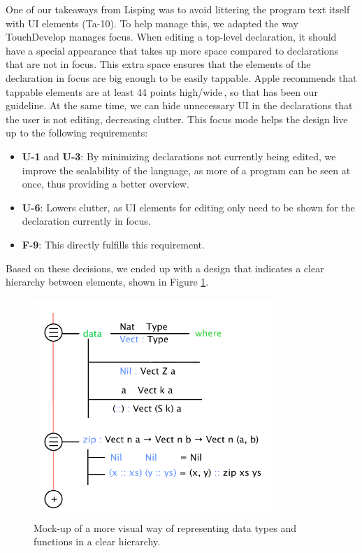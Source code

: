 
One of our takeaways from Lisping was to avoid littering the program text itself with UI elements
(Ta-10).
To help manage this, we adapted the way TouchDevelop manages focus.
When editing a top-level declaration, it should have a special appearance that takes up more space compared to declarations that are not in focus.
This extra space ensures that the elements of the declaration in focus are big enough to be easily tappable. 
Apple recommends that tappable elements are at least 44 points high/wide\,\cite{mobileHIG}, so that has
been our guideline.
At the same time, we can hide unnecessary UI in the declarations that the user is not editing, decreasing clutter.
This focus mode helps the design live up to the following requirements:
\begin{itemize}
	\item \textbf{U-1} and \textbf{U-3}: By minimizing declarations not currently being edited, we improve the scalability of the language, as more of a program can be seen at once, thus providing a better overview.
	\item \textbf{U-6}: Lowers clutter, as UI elements for editing only need to be shown for the declaration currently in focus.
	\item \textbf{F-9}: This directly fulfills this requirement.
\end{itemize}

Based on these decisions, we ended up with a design that indicates a clear hierarchy between elements, shown in Figure
\ref{fig:initial_mockup_design}.

\begin{figure}
	\centering
		\includegraphics[width=90mm]{diagrams/initial_mockup_design.pdf}
	\caption{Mock-up of a more visual way of representing data types and functions
	in a clear hierarchy.}
\label{fig:initial_mockup_design}
\end{figure}

